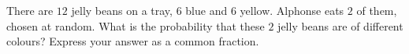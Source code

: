 There are $12$ jelly beans on a tray, $6$ blue and $6$ yellow. Alphonse eats $2$ of them, chosen at random. What is the probability that these $2$ jelly beans are of different colours? Express your answer as a common fraction.
